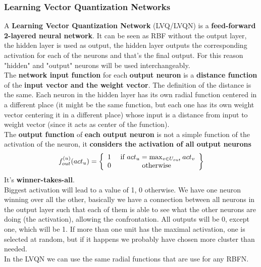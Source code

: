 \documentclass[11pt]{article}
\begin{document}
		\newpage
		
		\subsubsection{Learning Vector Quantization Networks}
		A \textbf{Learning Vector Quantization Network} (LVQ/LVQN) is a \textbf{feed-forward 2-layered neural network}. It can be seen as RBF without the output layer, the hidden layer is used as output, the hidden layer outputs the corresponding activation for each of the neurons and that's the final output. For this reason "hidden" and "output" neurons will be used interchangeably.\\
		
		The \textbf{network input function} for each \textbf{output neuron} is a \textbf{distance function} of the \textbf{input vector and the weight vector}. The definition of the distance is the same. Each neuron in the hidden layer has its own radial function centered in a different place (it might be the same function, but each one has its own weight vector centering it in a different place) whose input is a distance from input to weight vector (since it acts as center of the function).\\
		
		The \textbf{output function} of \textbf{each output neuron} is not a simple function of the activation of the neuron, it \textbf{considers the activation of all output neurons}
		$$ f_{out}^{(u)} (act_u) = \left\{
		\begin{array}{c c}
			1 & \text{ if } act_u = \max_{v \in U_{out}} act_v \\
			0 & \text{ otherwise }
		\end{array}
		\right\}$$ 
		It's \textbf{winner-takes-all}. \\
		
		Biggest activation will lead to a value of 1, 0 otherwise. We have one neuron winning over all the other, basically we have a connection between all neurons in the output layer such that each of them is able to see what the other neurons are doing (the activation), allowing the confrontation. All outputs will be 0, except one, which will be 1. If more than one unit has the maximal activation, one is selected at random, but if it happens we probably have chosen more cluster than needed.\\
		
		In the LVQN we can use the same radial functions that are use for any RBFN.
		
		\newpage
		
\end{document}
